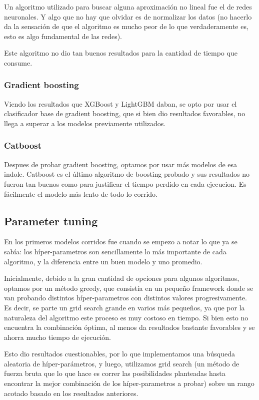 \documentclass[a4paper]{article}
\begin{document}
Un algoritmo utilizado para buscar alguna aproximación no lineal fue el de redes neuronales. Y algo que no hay que olvidar es de normalizar los datos (no hacerlo da la sensación de que el algoritmo es mucho peor de lo que verdaderamente es, esto es algo fundamental de las redes). 

Este algoritmo no dio tan buenos resultados para la cantidad de tiempo que consume.

\subsubsection{Gradient boosting}

Viendo los resultados que XGBoost y LightGBM daban, se opto por usar el clasificador base de gradient boosting, que si bien dio resultados favorables, no llega a superar a los modelos previamente utilizados.

\subsubsection{Catboost}

Despues de probar gradient boosting, optamos por usar más modelos de esa indole. Catboost es el último algoritmo de boosting probado y sus resultados no fueron tan buenos como para justificar el tiempo perdido en cada ejecucion. Es fácilmente el modelo más lento de todo lo corrido.

\subsection{Parameter tuning}

En los primeros modelos corridos fue cuando se empezo a notar lo que ya se sabía: los híper-parametros son sencillamente lo más importante de cada algoritmo, y la diferencia entre un buen modelo y uno promedio.

Inicialmente, debido a la gran cantidad de opciones para algunos algoritmos, optamos por un método greedy, que consistía en un pequeño framework donde se van probando distintos híper-parametros con distintos valores progresivamente. Es decir, se parte un grid search grande en varios más pequeños, ya que por la naturaleza del algoritmo este proceso es muy costoso en tiempo. Si bien esto no encuentra la combinación óptima, al menos da resultados bastante favorables y se ahorra mucho tiempo de ejecución.

Esto dio resultados cuestionables, por lo que implementamos una búsqueda aleatoria de híper-parámetros, y luego, utilizamos grid search (un método de fuerza bruta que lo que hace es correr las posibilidades planteadas hasta encontrar la mejor combinación de los híper-parametros a probar) sobre un rango acotado basado en los resultados anteriores.
\end{document}
